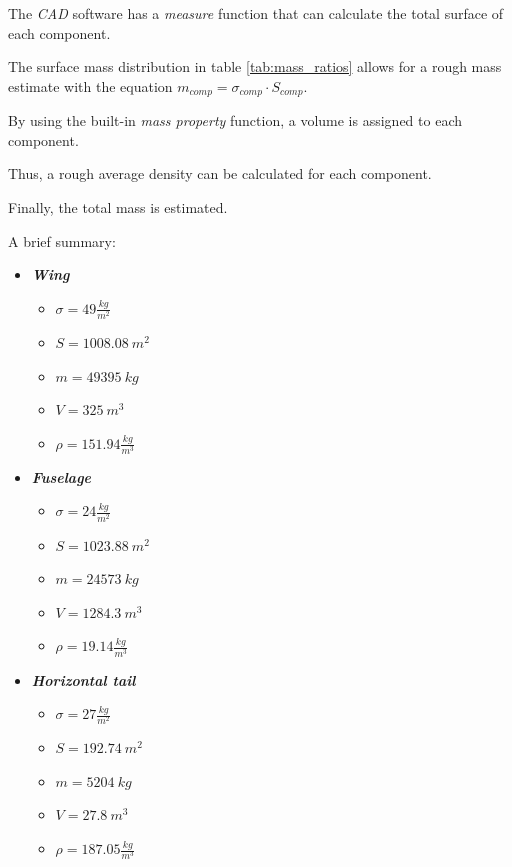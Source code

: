\documentclass{article}
\begin{document}
The \textit{CAD} software has a \textit{measure} function that can calculate the total surface of each component. 

The surface mass distribution in table \ref{tab:mass_ratios} allows for a rough mass estimate with 
the equation $m_{comp} = \sigma_{comp} \cdot S_{comp}$.

By using the built-in \textit{mass property} function, a volume is assigned to each component. 

Thus, a rough average density can be calculated for each component. 

Finally, the total mass is estimated. \\ 
\clearpage

A brief summary:

\begin{itemize}
    \item \textbf{\textit{Wing}}
        \begin{itemize}
            \item $\sigma = 49 \frac{kg}{m^2}$
            \item $S = 1008.08 \ m^2$
            \item $m = 49395 \ kg$
            \item $V = 325 \ m^3$
            \item $\rho = 151.94 \frac{kg}{m^3}$
        \end{itemize}
    \item \textbf{\textit{Fuselage}}
        \begin{itemize}
            \item $\sigma = 24 \frac{kg}{m^2}$
            \item $S = 1023.88 \ m^2$
            \item $m = 24573 \ kg$
            \item $V = 1284.3 \ m^3$
            \item $\rho = 19.14 \frac{kg}{m^3}$
        \end{itemize}
    \item \textbf{\textit{Horizontal tail}}
        \begin{itemize}
            \item $\sigma = 27 \frac{kg}{m^2}$
            \item $S = 192.74 \ m^2$
            \item $m = 5204 \ kg$
            \item $V = 27.8 \ m^3$
            \item $\rho = 187.05 \frac{kg}{m^3}$

\end{itemize}
\end{itemize}
\end{document}
